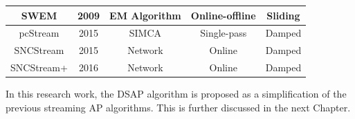 \begin{table}[h]
\begin{tabular}{c c c c c}
     \hline
      SWEM               &    2009        &  EM Algorithm     &  Online-offline     & Sliding\\
     \hline
     pcStream            &    2015        &    SIMCA          &   Single-pass       & Damped  \\
    \hline 
      SNCStream          &    2015        &    Network        &   Online            & Damped  \\
    \hline 
    SNCStream+      &    2016        &       Network     &    Online           & Damped  \\
      
\bottomrule
    \end{tabular}
\end{table}

In this research work, the DSAP algorithm is proposed as a simplification of the previous streaming AP algorithms. This is further discussed in the next Chapter.








